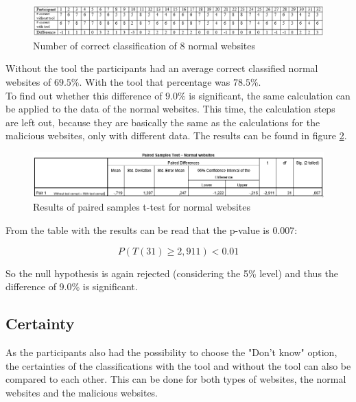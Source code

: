 \documentclass[twoside,openright,notitlepage]{uva-bachelor-thesis}
\begin{document}
\begin{figure}[h!]
    \centering
    \includegraphics[width=1.2\textwidth, center]{img/tabel_good.PNG}
    \caption{Number of correct classification of 8 normal websites}
    \label{fig:tabel_good}
\end{figure}

Without the tool the participants had an average correct classified normal websites of $ 69.5 \%$. With the tool that percentage was $ 78.5 \%$.\\

To find out whether this difference of $9.0 \%$ is significant, the same calculation can be applied to the data of the normal websites. This time, the calculation steps are left out, because they are basically the same as the calculations for the malicious websites, only with different data. The results can be found in figure \ref{fig:tabel_good_results}.

\begin{figure}[h!]
    \centering
    \includegraphics[width=1.2\textwidth, center]{img/tabel_good_results.PNG}
    \caption{Results of paired samples t-test for normal websites}
    \label{fig:tabel_good_results}
\end{figure}

From the table with the results can be read that the p-value is 0.007:

$$ P(T(31) \ge 2{,}911) < 0.01 $$

So the null hypothesis is again rejected (considering the 5\% level) and thus the difference of 9.0\% is significant.

\subsection{Certainty}
As the participants also had the possibility to choose the "Don't know" option, the certainties of the classifications with the tool and without the tool can also be compared to each other. This can be done for both types of websites, the normal websites and the malicious websites.\\
\end{document}

